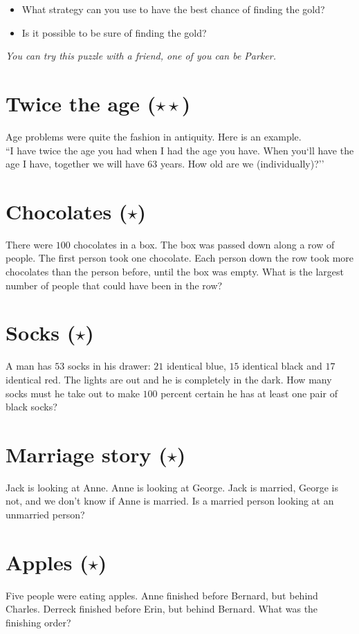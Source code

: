 \documentclass[11pt]{article}
\begin{document}
\begin{itemize}
  \item What strategy can you use to have the best chance of finding the gold?
  \item Is it possible to be sure of finding the gold?
\end{itemize}
\emph{You can try this puzzle with a friend, one of you can be Parker.}

\section{Twice the age ($\star\star$)}
\noindent Age problems were quite the fashion in antiquity. Here is an
example.\\[5mm]
``I have twice the age you had when I had the age you have.
When you`ll have the age I have, together we will have 63 years.
How old are we (individually)?''

\section{Chocolates ($\star$)}
\noindent There were $100$ chocolates in a box. The box was passed down along a row of
people. The first person took one chocolate. Each person down the row took more
chocolates than the person before, until the box was empty.
What is the largest number of people that could have been in the row?

\section{Socks ($\star$)}
\noindent A man has $53$ socks in his drawer: $21$ identical blue, $15$
identical black and $17$ identical red. The lights are out and he is completely
in the dark. How many socks must he take out to make $100$ percent certain he
has at least one pair of black socks?

\section{Marriage story ($\star$)}
\noindent Jack is looking at Anne. Anne is looking at George. Jack is married,
George is not, and we don’t know if Anne is married. Is a married person looking
at an unmarried person?

\section{Apples ($\star$)}
\noindent Five people were eating apples. Anne finished before Bernard, but
behind Charles. Derreck finished before Erin, but behind Bernard. What was the
finishing order?
\end{document}
